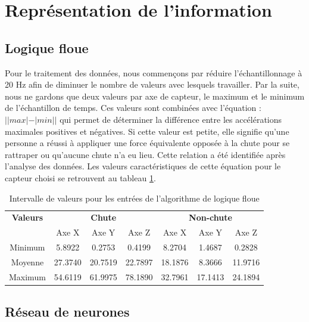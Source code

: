 \documentclass[12pt,letterpaper]{article}
\begin{document}
\section{Représentation de l'information}

\subsection{Logique floue}
Pour le traitement des données, nous commençons par réduire l'échantillonnage à 20 Hz afin de diminuer le nombre de valeurs avec lesquels travailler. Par la suite, nous ne gardons que deux valeurs par axe de capteur, le maximum et le minimum de l'échantillon de temps. Ces valeurs sont combinées avec l'équation : $||max|-|min||$ qui permet de déterminer la différence entre les accélérations maximales positives et négatives. Si cette valeur est petite, elle signifie qu'une personne a réussi à appliquer une force équivalente opposée à la chute pour se rattraper ou qu'aucune chute n'a eu lieu. Cette relation a été identifiée après l'analyse des données. Les valeurs caractéristiques de cette équation pour le capteur choisi se retrouvent au tableau \ref{tbl:f_input_val}.

\begin{table}[h]
  \begin{center}
    \begin{tabular} {|c|c|c|c|c|c|c|}
        \hline
        \textbf{Valeurs} & \multicolumn{3}{|c|}{\textbf{Chute}} & \multicolumn{3}{|c|}{\textbf{Non-chute}} \\ \cline{2-7}
         & Axe X & Axe Y & Axe Z & Axe X & Axe Y & Axe Z \\
        \hline
        Minimum & 5.8922  & 0.2753  & 0.4199  & 8.2704  & 1.4687  & 0.2828 \\
        \hline
        Moyenne & 27.3740 & 20.7519 & 22.7897 & 18.1876 & 8.3666  & 11.9716 \\
        \hline
        Maximum & 54.6119 & 61.9975 & 78.1890 & 32.7961 & 17.1413 & 24.1894 \\
        \hline
    \end{tabular}
    \caption{Intervalle de valeurs pour les entrées de l'algorithme de logique floue}
    \label{tbl:f_input_val}
  \end{center}
\end{table}

\subsection{Réseau de neurones} %
\end{document}
